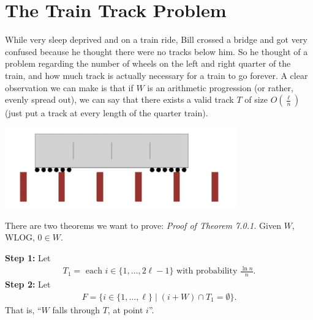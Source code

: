 \documentclass{report}
\begin{document}
\chapter{The Train Track Problem}
While very sleep deprived and on a train ride, Bill crossed a bridge and got very confused because he thought there were no tracks below him. So he thought of a problem regarding the number of wheels on the left and right quarter of the train, and how much track is actually necessary for a train to go forever. 
\noindent A clear observation we can make is that if $W$ is an arithmetic progression (or rather, evenly spread out), we can say that there exists a valid track $T$ of size $O\left( \frac \ell n \right)$ (just put a track at every length of the quarter train).
\begin{center}
    \includegraphics*[width=10cm]{train.png}
\end{center}
There are two theorems we want to prove:
\newpage
\noindent \textit{Proof of Theorem 7.0.1.} Given $W$, WLOG, $0 \in W$. 

\noindent \textbf{Step 1:} Let 
\begin{align*}
    T_1 = \text{ each $i \in \{1, \ldots, 2\ell - 1\}$ with probability $\frac{\ln n}{n}$.} 
\end{align*}
\textbf{Step 2:} Let 
\begin{align*}
    F = \{ i \in \{1, \ldots, \ell \} \mid (i + W) \cap T_1  = \emptyset \}.
\end{align*}
That is, ``$W$ falls through $T$, at point $i$''.
\end{document}
